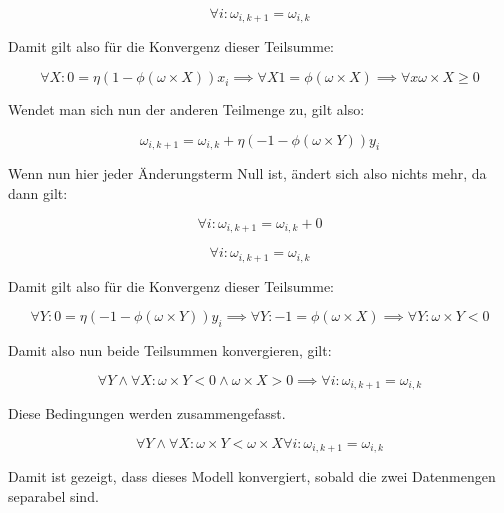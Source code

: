 \documentclass[11pt]{article} %
\begin{document}
\begin{equation}
\forall i :\omega_{i, k+1} = \omega_{i, k}
\end{equation}

Damit gilt also für die Konvergenz dieser Teilsumme:

\begin{equation}
\forall X: 0 =  \eta(1 - \phi{(\omega \times X)})x_{i} \implies \forall X 1 = \phi{(\omega \times X)} \implies \forall x \omega \times X \geq 0
\end{equation}

Wendet man sich nun der anderen Teilmenge zu, gilt also:

\begin{equation}
\omega_{i, k+1} = \omega_{i, k} + \eta(-1 - \phi{(\omega \times Y)})y_{i}
\end{equation}

Wenn nun hier jeder Änderungsterm Null ist, ändert sich also nichts mehr, da dann gilt:

\begin{equation}
\forall i:  \omega_{i, k+1} = \omega_{i, k} + 0
\end{equation}

\begin{equation}
\forall i :\omega_{i, k+1} = \omega_{i, k}
\end{equation}

Damit gilt also für die Konvergenz dieser Teilsumme:

\begin{equation}
\forall Y: 0 =  \eta(- 1 - \phi{(\omega \times Y)})y_{i} \implies \forall Y: -1 = \phi{(\omega \times X)} \implies \forall Y: \omega \times Y < 0
\end{equation}

Damit also nun beide Teilsummen konvergieren, gilt:

\begin{equation}
\forall Y \wedge \forall X: \omega \times Y < 0 \wedge  \omega \times X > 0 \implies \forall i :\omega_{i, k+1} = \omega_{i, k}
\end{equation}

Diese Bedingungen werden zusammengefasst.

\begin{equation}
\forall Y \wedge \forall X: \omega \times Y <   \omega \times X \forall i :\omega_{i, k+1} = \omega_{i, k}
\end{equation}

Damit ist gezeigt, dass dieses Modell konvergiert, sobald die zwei Datenmengen separabel sind. 
\end{document}
